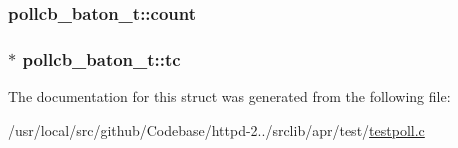 \subsubsection[{\texorpdfstring{count}{count}}]{ pollcb\+\_\+baton\+\_\+t\+::count}\hypertarget{structpollcb__baton__t_a924428012234a346cd47119588a95c6c}{}\label{structpollcb__baton__t_a924428012234a346cd47119588a95c6c}
\subsubsection[{\texorpdfstring{tc}{tc}}]{$\ast$ pollcb\+\_\+baton\+\_\+t\+::tc}\hypertarget{structpollcb__baton__t_a41e5ed8e2c9436bbc8f0a00c280ebba1}{}\label{structpollcb__baton__t_a41e5ed8e2c9436bbc8f0a00c280ebba1}


The documentation for this struct was generated from the following file\+:\begin{DoxyCompactItemize}
\item 
/usr/local/src/github/\+Codebase/httpd-\/2../srclib/apr/test/\hyperlink{testpoll_8c}{testpoll.\+c}\end{DoxyCompactItemize}
